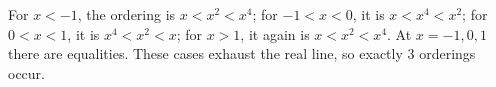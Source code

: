 For $x<-1$, the ordering is $x<x^2<x^4$; for $-1<x<0$, it is $x<x^4<x^2$; for $0<x<1$, it is $x^4<x^2<x$; for $x>1$, it again is $x<x^2<x^4$. At $x=-1,0,1$ there are equalities. These cases exhaust the real line, so exactly $\boxed3$ orderings occur.
